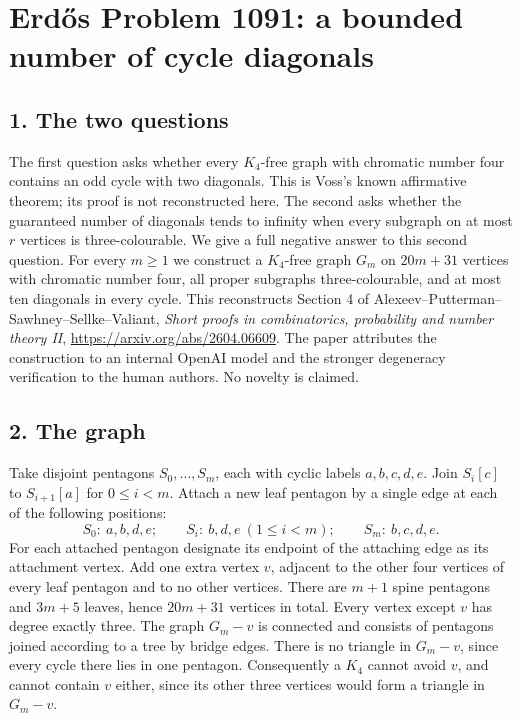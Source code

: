 \section*{Erd\H{o}s Problem 1091: a bounded number of cycle diagonals}
\subsection*{1. The two questions}
The first question asks whether every $K_4$-free graph with chromatic number four contains an odd cycle with two diagonals. This is Voss's known affirmative theorem; its proof is not reconstructed here. The second asks whether the guaranteed number of diagonals tends to infinity when every subgraph on at most $r$ vertices is three-colourable. We give a full negative answer to this second question.
For every $m\ge1$ we construct a $K_4$-free graph $G_m$ on $20m+31$ vertices with chromatic number four, all proper subgraphs three-colourable, and at most ten diagonals in every cycle. This reconstructs Section 4 of Alexeev--Putterman--Sawhney--Sellke--Valiant, \emph{Short proofs in combinatorics, probability and number theory II}, \url{https://arxiv.org/abs/2604.06609}. The paper attributes the construction to an internal OpenAI model and the stronger degeneracy verification to the human authors. No novelty is claimed.

\subsection*{2. The graph}
Take disjoint pentagons $S_0,\ldots,S_m$, each with cyclic labels $a,b,c,d,e$. Join $S_i[c]$ to $S_{i+1}[a]$ for $0\le i<m$. Attach a new leaf pentagon by a single edge at each of the following positions:
\[
 S_0:\ a,b,d,e;\qquad S_i:\ b,d,e\ (1\le i<m);\qquad S_m:\ b,c,d,e.
\]
For each attached pentagon designate its endpoint of the attaching edge as its attachment vertex. Add one extra vertex $v$, adjacent to the other four vertices of every leaf pentagon and to no other vertices. There are $m+1$ spine pentagons and $3m+5$ leaves, hence $20m+31$ vertices in total. Every vertex except $v$ has degree exactly three. The graph $G_m-v$ is connected and consists of pentagons joined according to a tree by bridge edges.
There is no triangle in $G_m-v$, since every cycle there lies in one pentagon. Consequently a $K_4$ cannot avoid $v$, and cannot contain $v$ either, since its other three vertices would form a triangle in $G_m-v$.


